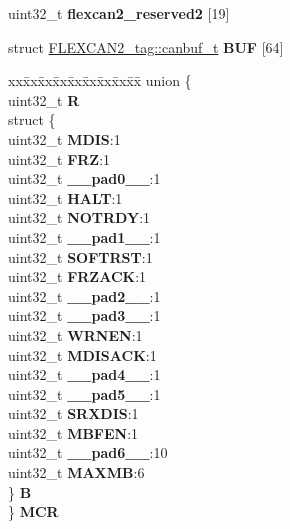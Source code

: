 \begin{DoxyCompactItemize}
\begin{tabbing}
\end{tabbing}\item 
\mbox{\label{structFLEXCAN2__tag_a928f5fdd9f3b1597e948df4554146e62}} 
uint32\+\_\+t {\bfseries flexcan2\+\_\+reserved2} \mbox{[}19\mbox{]}
\item 
\mbox{\label{structFLEXCAN2__tag_af67df5a6473d2add9c1f4b9334fe691c}} 
struct \mbox{\hyperlink{structFLEXCAN2__tag_1_1canbuf__t}{F\+L\+E\+X\+C\+A\+N2\+\_\+tag\+::canbuf\+\_\+t}} {\bfseries B\+UF} \mbox{[}64\mbox{]}
\item 
\mbox{\label{structFLEXCAN2__tag_af7fd50367795f809c5471d702e538b57}} 
\begin{tabbing}
xx\=xx\=xx\=xx\=xx\=xx\=xx\=xx\=xx\=\kill
union \{\\
\>uint32\_t {\bfseries R}\\
\>struct \{\\
\>\>uint32\_t {\bfseries MDIS}:1\\
\>\>uint32\_t {\bfseries FRZ}:1\\
\>\>uint32\_t {\bfseries \_\_pad0\_\_}:1\\
\>\>uint32\_t {\bfseries HALT}:1\\
\>\>uint32\_t {\bfseries NOTRDY}:1\\
\>\>uint32\_t {\bfseries \_\_pad1\_\_}:1\\
\>\>uint32\_t {\bfseries SOFTRST}:1\\
\>\>uint32\_t {\bfseries FRZACK}:1\\
\>\>uint32\_t {\bfseries \_\_pad2\_\_}:1\\
\>\>uint32\_t {\bfseries \_\_pad3\_\_}:1\\
\>\>uint32\_t {\bfseries WRNEN}:1\\
\>\>uint32\_t {\bfseries MDISACK}:1\\
\>\>uint32\_t {\bfseries \_\_pad4\_\_}:1\\
\>\>uint32\_t {\bfseries \_\_pad5\_\_}:1\\
\>\>uint32\_t {\bfseries SRXDIS}:1\\
\>\>uint32\_t {\bfseries MBFEN}:1\\
\>\>uint32\_t {\bfseries \_\_pad6\_\_}:10\\
\>\>uint32\_t {\bfseries MAXMB}:6\\
\>\} {\bfseries B}\\
\} {\bfseries MCR}\\


\end{tabbing}
\end{DoxyCompactItemize}
